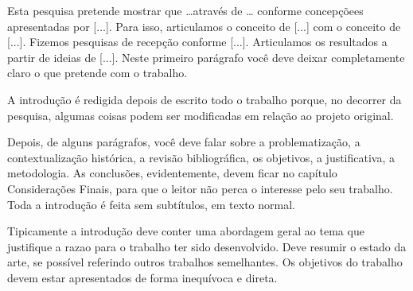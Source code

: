 %
%


\label{cap_introducao}

Esta  pesquisa  pretende  mostrar  que  \ldots   através  de  \ldots
    conforme   concepçõees   apresentadas   por  [...].    Para   isso,
    articulamos o conceito de [...]  com o conceito de [...].  Fizemos
    pesquisas de recepção conforme  [...]. Articulamos os resultados a
    partir de  ideias de [...].  Neste primeiro parágrafo  você deve
    deixar  completamente claro  o  que pretende  com  o trabalho.  

    A introdução é redigida depois de escrito todo o trabalho porque,
    no decorrer da pesquisa, algumas coisas podem ser modificadas em
    relação ao projeto original.

    Depois,  de alguns parágrafos,   você  deve  falar   sobre  a
    problematização,   a   contextualização   histórica,   a   revisão
    bibliográfica,  os objetivos, a  justificativa, a  metodologia. As
    conclusões, evidentemente,  devem ficar no  capítulo Considerações
    Finais,  para  que  o  leitor  não  perca  o  interesse  pelo  seu
    trabalho.  Toda a  introdução  é feita  sem  subtítulos, em  texto
    normal.

    Tipicamente a introdução deve conter uma abordagem geral ao tema
    que justifique a razao para o trabalho ter sido desenvolvido. Deve
    resumir o estado da arte, se possível referindo outros trabalhos
    semelhantes. Os objetivos do trabalho devem estar apresentados de
    forma inequívoca e direta.
    
